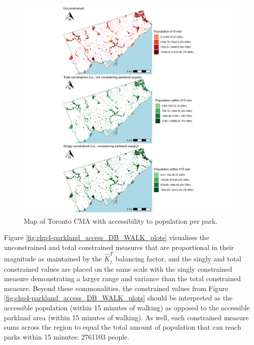 \documentclass[
11pt, %
oneside, %
english, %
singlespacing, %
]{macthesis} %
\begin{document}
\begin{figure}

{\centering \includegraphics[width=6in]{./data/figures/chp4-pop_access_DB_WALK_plots} 

}

\caption{\label{fig:chp4-parkland_access_DB_WALK_plots}Map of Toronto CMA with accessibility to population per park.}\label{fig:unnamed-chunk-68}
\end{figure}

Figure \ref{fig:chp4-parkland_access_DB_WALK_plots} visualises the unconstrained and total constrained measures that are proportional in their magnitude as maintained by the \(\hat K^T_j\) balancing factor, and the singly and total constrained values are placed on the same scale with the singly constrained measure demonstrating a larger range and variance than the total constrained measure. Beyond these commonalities, the constrained values from Figure \ref{fig:chp4-parkland_access_DB_WALK_plots} should be interpreted as the accessible population (within 15 minutes of walking) as opposed to the accessible parkland area (within 15 minutes of walking). As well, each constrained measure sums across the region to equal the total amount of population that can reach parks within 15 minutes: 2761103 people.
\end{document}
